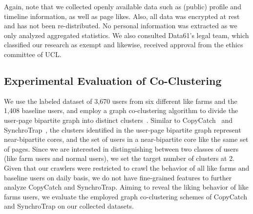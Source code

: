 \documentclass[twocolumn,10pt,letterpaper]{article}
\begin{document}
%
Again, note that we collected openly available data such as (public) profile and timeline information, as well as page likes. Also, all data was encrypted at rest and has not been re-distributed. No personal information was extracted as we only analyzed aggregated statistics. We also consulted Data61's legal team, which classified our research as exempt and likewise, received approval from the ethics committee of UCL.




%
\subsection{Experimental Evaluation of Co-Clustering}


%
We use the labeled dataset of 3,670 users from six different like farms and the 1,408 baseline users, and employ a graph co-clustering algorithm to divide the user-page bipartite graph into distinct clusters~\cite{Kluger03biclustering}. Similar to CopyCatch~\cite{beutel2013copycatch} and SynchroTrap~\cite{cao14synchrotrap}, the clusters identified in the user-page bipartite graph represent near-bipartite cores, and the set of users in a near-bipartite core like the same set of pages. Since we are interested in distinguishing between two classes of users (like farm users and normal users), we set the target number of clusters at 2. Given that our crawlers were restricted to crawl the behavior of all like farms and baseline users on daily basis, we do not have fine-grained features to further analyze CopyCatch and SynchroTrap. Aiming to reveal the liking behavior of like farms users, we evaluate the employed graph co-clustering schemes of CopyCatch and SynchroTrap on our collected datasets. %


\begin{table}[t]
%
  \begin{center}
\tabcolsep=0.11cm
\vspace{-0.15cm}
      \caption{Effectiveness of the graph co-clustering algorithm.}
          \label{tab:clustering_accuracy}
  \end{center}
\end{table}
\end{document}
